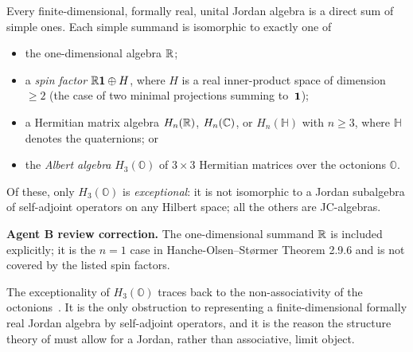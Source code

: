 \begin{theorem}\label{thm:jnw-classification}
Every finite-dimensional, formally real, unital Jordan algebra is a direct sum of
simple ones. Each simple summand is isomorphic to exactly one of
\begin{itemize}
  \item the one-dimensional algebra $\mathbb{R}$;
  \item a \emph{spin factor} $\mathbb{R}\mathbf{1}\oplus H$, where $H$ is a real inner-product
    space of dimension $\ge 2$ (the case of two minimal projections summing
    to~$\mathbf{1}$);
  \item a Hermitian matrix algebra $H_n(\mathbb{R})$, $H_n(\mathbb{C})$, or $H_n(\mathbb{H})$
    with $n\ge 3$, where $\mathbb{H}$ denotes the quaternions; or
  \item the \emph{Albert algebra} $H_3(\mathbb{O})$ of $3\times 3$ Hermitian
    matrices over the octonions $\mathbb{O}$.
\end{itemize}
Of these, only $H_3(\mathbb{O})$ is \emph{exceptional}: it is not isomorphic to a
Jordan subalgebra of self-adjoint operators on any Hilbert space; all the others
are JC-algebras.
\end{theorem}

\smallskip\noindent\textbf{Agent B review correction.}
The one-dimensional summand $\mathbb{R}$ is included explicitly; it is the $n=1$ case in
Hanche-Olsen--St{\o}rmer Theorem 2.9.6 and is not covered by the listed spin
factors.


\begin{remark}\label{rem:exceptional}
The exceptionality of $H_3(\mathbb{O})$ traces back to the non-associativity of
the octonions~\cite[2.8.5]{HancheOlsenStormer1984}. It is the only obstruction to
representing a finite-dimensional formally real Jordan algebra by self-adjoint
operators, and it is the reason the structure theory of  must
allow for a Jordan, rather than associative, limit object.
\end{remark}
